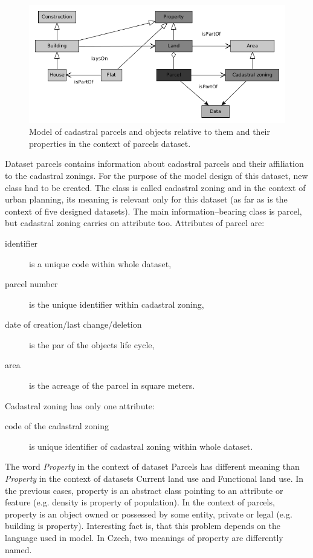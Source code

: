 \documentclass{lncs-template/llncs}
\begin{document}

\begin{figure}
 \includegraphics[width=1.0\textwidth]{images/PARCELS.png}
 \caption{Model of cadastral parcels and objects relative to them and their properties in the context of parcels dataset.}\label{fig:dat_par}
\end{figure}

Dataset parcels contains information about cadastral parcels and their affiliation to the cadastral zonings. For the purpose of the model design of this dataset, new class had to be created. The class is called cadastral zoning and in the context of urban planning, its meaning is relevant only for this dataset (as far as is the context of five designed datasets). The main information--bearing class is parcel, but cadastral zoning carries on attribute too. Attributes of parcel are:
\begin{description}
\item[identifier] is a unique code within whole dataset,
\item[parcel number] is the unique identifier within cadastral zoning,
\item[date of creation/last change/deletion] is the par of the objects life cycle,
\item[area] is the acreage of the parcel in square meters.
\end{description}
Cadastral zoning has only one attribute:
\begin{description}
\item[code of the cadastral zoning] is unique identifier of cadastral zoning within whole dataset.
\end{description}

The word \textit{Property} in the context of dataset Parcels has different meaning than \textit{Property} in the context of datasets Current land use and Functional land use. In the previous cases, property is an abstract class pointing to an attribute or feature (e.g. density is property of population). In the context of parcels, property is an object owned or possessed by some entity, private or legal (e.g. building is property). Interesting fact is, that this problem depends on the language used in model. In Czech, two meanings of property are differently named.
\end{document}
